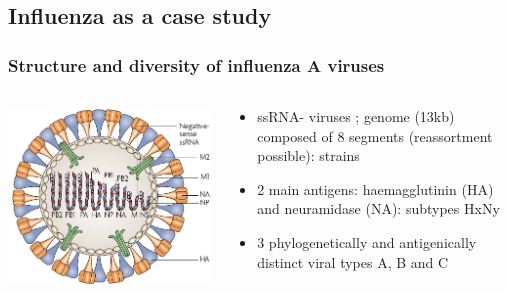 \documentclass{beamer}
\begin{document}
\subsection{Influenza as a case study}


\begin{frame}
  \frametitle{Structure and diversity of influenza A viruses}
  \begin{columns}[t]
    \begin{column}{0.3 \linewidth}
      \begin{center}
        \includegraphics[width=1 \linewidth]{graph/struc.png}
      \end{center}
    \end{column}
    \begin{column}{0.7 \linewidth}
      \begin{itemize}
      \item ssRNA- viruses ; genome (13kb) composed of 8 segments (reassortment possible): \alert{strains}
      \item 2 main antigens: haemagglutinin (HA) and neuramidase (NA):
        \alert{subtypes HxNy}
      \item 3 phylogenetically and antigenically distinct viral \alert{types} A, B and C
      \end{itemize}
    \end{column}
  \end{columns}
\end{frame}
\end{document}
